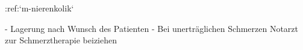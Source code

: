 :ref:`m-nierenkolik`%
\begin{itemize}
  -   Lagerung nach Wunsch des Patienten
  -   Bei unerträglichen Schmerzen Notarzt zur
  Schmerztherapie beiziehen
\end{itemize}
